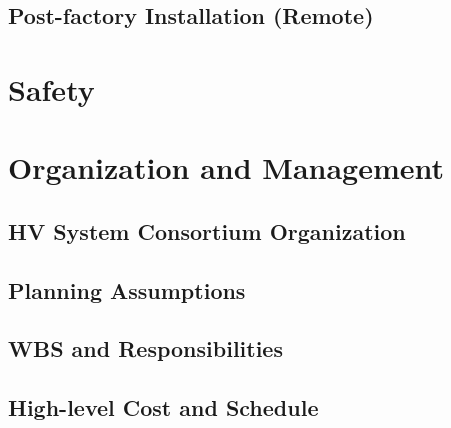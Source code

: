 \subsection{Post-factory Installation (Remote)}
\label{sec:fddp-hv-qc-remote}





\section{Safety}
\label{sec:fddp-hv-safety}






\section{Organization and Management}
\label{sec:fddp-hv-org}

\subsection{HV System Consortium Organization}
\label{sec:fddp-hv-org-consortium}


\subsection{Planning Assumptions}
\label{sec:fddp-hv-org-assmp}


\subsection{WBS and Responsibilities}
\label{sec:fddp-hv-org-wbs}

\subsection{High-level Cost and Schedule}
\label{sec:fddp-hv-org-cs}














